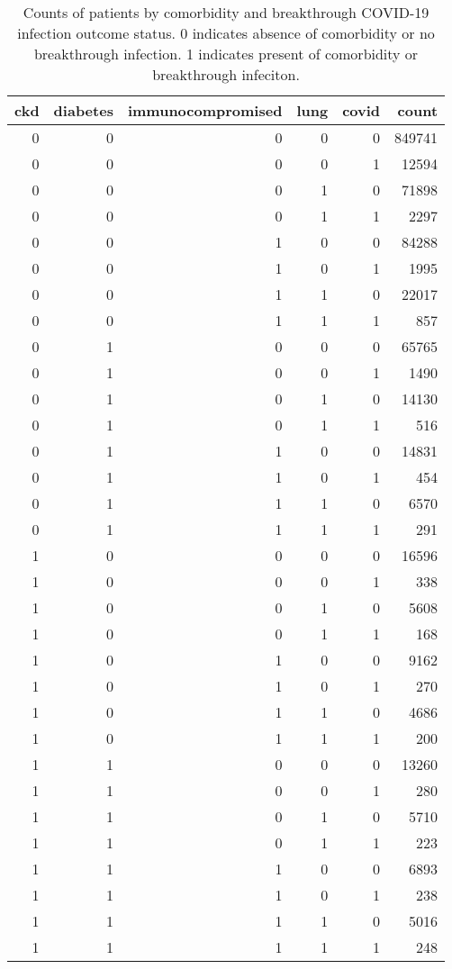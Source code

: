 \begin{table}[!htbp]
\centering
\begin{tabular}{rrrrrr}
  \hline
ckd & diabetes & immunocompromised & lung & covid & count \\ 
  \hline
  0 &   0 &   0 &   0 &   0 & 849741 \\ 
    0 &   0 &   0 &   0 &   1 & 12594 \\ 
    0 &   0 &   0 &   1 &   0 & 71898 \\ 
    0 &   0 &   0 &   1 &   1 & 2297 \\ 
    0 &   0 &   1 &   0 &   0 & 84288 \\ 
    0 &   0 &   1 &   0 &   1 & 1995 \\ 
    0 &   0 &   1 &   1 &   0 & 22017 \\ 
    0 &   0 &   1 &   1 &   1 & 857 \\ 
    0 &   1 &   0 &   0 &   0 & 65765 \\ 
    0 &   1 &   0 &   0 &   1 & 1490 \\ 
    0 &   1 &   0 &   1 &   0 & 14130 \\ 
    0 &   1 &   0 &   1 &   1 & 516 \\ 
    0 &   1 &   1 &   0 &   0 & 14831 \\ 
    0 &   1 &   1 &   0 &   1 & 454 \\ 
    0 &   1 &   1 &   1 &   0 & 6570 \\ 
    0 &   1 &   1 &   1 &   1 & 291 \\ 
    1 &   0 &   0 &   0 &   0 & 16596 \\ 
    1 &   0 &   0 &   0 &   1 & 338 \\ 
    1 &   0 &   0 &   1 &   0 & 5608 \\ 
    1 &   0 &   0 &   1 &   1 & 168 \\ 
    1 &   0 &   1 &   0 &   0 & 9162 \\ 
    1 &   0 &   1 &   0 &   1 & 270 \\ 
    1 &   0 &   1 &   1 &   0 & 4686 \\ 
    1 &   0 &   1 &   1 &   1 & 200 \\ 
    1 &   1 &   0 &   0 &   0 & 13260 \\ 
    1 &   1 &   0 &   0 &   1 & 280 \\ 
    1 &   1 &   0 &   1 &   0 & 5710 \\ 
    1 &   1 &   0 &   1 &   1 & 223 \\ 
    1 &   1 &   1 &   0 &   0 & 6893 \\ 
    1 &   1 &   1 &   0 &   1 & 238 \\ 
    1 &   1 &   1 &   1 &   0 & 5016 \\ 
    1 &   1 &   1 &   1 &   1 & 248 \\ 
   \hline
\end{tabular}
\caption{Counts of patients by comorbidity and breakthrough COVID-19 infection outcome status. 0 indicates absence of comorbidity or no breakthrough infection. 1 indicates present of comorbidity or breakthrough infeciton.} 
\label{tab:breakthrough_counts}
\end{table}
